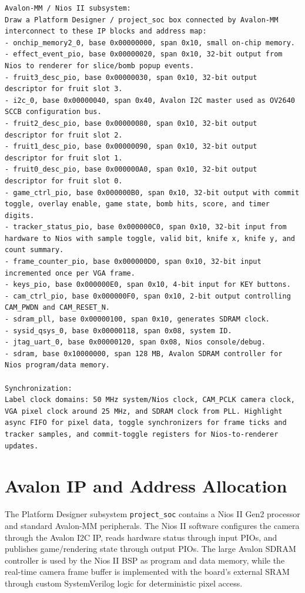 \documentclass[10pt]{article}
\begin{document}
\begin{lstlisting}
Avalon-MM / Nios II subsystem:
Draw a Platform Designer / project_soc box connected by Avalon-MM interconnect to these IP blocks and address map:
- onchip_memory2_0, base 0x00000000, span 0x10, small on-chip memory.
- effect_event_pio, base 0x00000020, span 0x10, 32-bit output from Nios to renderer for slice/bomb popup events.
- fruit3_desc_pio, base 0x00000030, span 0x10, 32-bit output descriptor for fruit slot 3.
- i2c_0, base 0x00000040, span 0x40, Avalon I2C master used as OV2640 SCCB configuration bus.
- fruit2_desc_pio, base 0x00000080, span 0x10, 32-bit output descriptor for fruit slot 2.
- fruit1_desc_pio, base 0x00000090, span 0x10, 32-bit output descriptor for fruit slot 1.
- fruit0_desc_pio, base 0x000000A0, span 0x10, 32-bit output descriptor for fruit slot 0.
- game_ctrl_pio, base 0x000000B0, span 0x10, 32-bit output with commit toggle, overlay enable, game state, bomb hits, score, and timer digits.
- tracker_status_pio, base 0x000000C0, span 0x10, 32-bit input from hardware to Nios with sample toggle, valid bit, knife x, knife y, and count summary.
- frame_counter_pio, base 0x000000D0, span 0x10, 32-bit input incremented once per VGA frame.
- keys_pio, base 0x000000E0, span 0x10, 4-bit input for KEY buttons.
- cam_ctrl_pio, base 0x000000F0, span 0x10, 2-bit output controlling CAM_PWDN and CAM_RESET_N.
- sdram_pll, base 0x00000100, span 0x10, generates SDRAM clock.
- sysid_qsys_0, base 0x00000118, span 0x08, system ID.
- jtag_uart_0, base 0x00000120, span 0x08, Nios console/debug.
- sdram, base 0x10000000, span 128 MB, Avalon SDRAM controller for Nios program/data memory.

Synchronization:
Label clock domains: 50 MHz system/Nios clock, CAM_PCLK camera clock, VGA pixel clock around 25 MHz, and SDRAM clock from PLL. Highlight async FIFO for pixel data, toggle synchronizers for frame ticks and tracker samples, and commit-toggle registers for Nios-to-renderer updates.
\end{lstlisting}

\section{Avalon IP and Address Allocation}

The Platform Designer subsystem \texttt{project\_soc} contains a Nios II Gen2 processor and standard Avalon-MM peripherals. The Nios II software configures the camera through the Avalon I2C IP, reads hardware status through input PIOs, and publishes game/rendering state through output PIOs. The large Avalon SDRAM controller is used by the Nios II BSP as program and data memory, while the real-time camera frame buffer is implemented with the board's external SRAM through custom SystemVerilog logic for deterministic pixel access.
\end{document}
